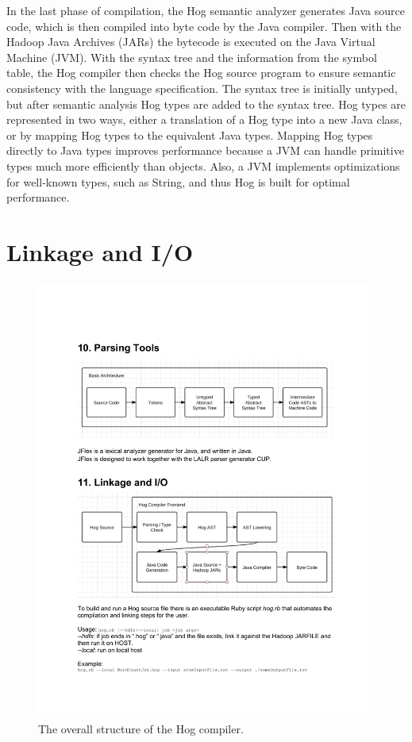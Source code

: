 \documentclass{article}
\begin{document}
In the last phase of compilation, the Hog semantic analyzer generates Java source code,
which is then compiled into byte code by the Java compiler. Then with the Hadoop Java Archives
(JARs) the bytecode is executed on the Java Virtual Machine (JVM). With the syntax tree and
the information from the symbol table, the Hog compiler then checks the Hog source program
to ensure semantic consistency with the language specification. The syntax tree is initially
untyped, but after semantic analysis Hog types are added to the syntax tree. Hog types are
represented in two ways, either a translation of a Hog type into a new Java class, or by
mapping Hog types to the equivalent Java types. Mapping Hog types directly to Java types
improves performance because a JVM can handle primitive types much more efficiently than 
objects. Also, a JVM implements optimizations for well-known types, such as String, and 
thus Hog is built for optimal performance.


\section{Linkage and I/O} %
\label{sec:linkage_and_i_o}

\begin{center}
\begin{figure}
  \label{fig:hog_compiler}
  \includegraphics[width=1.0\textwidth]{img/hog_compiler.pdf}
  \caption{The overall structure of the Hog compiler.}
\end{figure}
\end{center}
\end{document}
